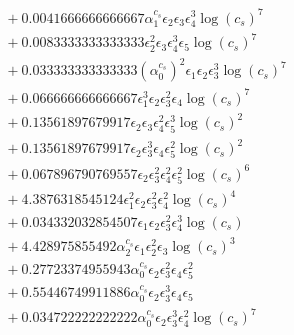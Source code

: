 \documentclass[10pt]{article}
\begin{document}
\begin{align*}
&{}  + 0.0041666666666667 \alpha_{1}^{c_s} \epsilon_{2} \epsilon_{3} \epsilon_{4}^{3} \log{\left(c_{s} \right)}^{7} \\
&{}  + 0.0083333333333333 \epsilon_{2}^{2} \epsilon_{3} \epsilon_{4}^{3} \epsilon_{5} \log{\left(c_{s} \right)}^{7} \\
&{}  + 0.033333333333333 \left(\alpha_{0}^{c_s}\right)^{2} \epsilon_{1} \epsilon_{2} \epsilon_{3}^{3} \log{\left(c_{s} \right)}^{7} \\
&{}  + 0.066666666666667 \epsilon_{1}^{3} \epsilon_{2} \epsilon_{3}^{2} \epsilon_{4} \log{\left(c_{s} \right)}^{7} \\
&{}  + 0.13561897679917 \epsilon_{2} \epsilon_{3} \epsilon_{4}^{2} \epsilon_{5}^{3} \log{\left(c_{s} \right)}^{2} \\
&{}  + 0.13561897679917 \epsilon_{2} \epsilon_{3}^{3} \epsilon_{4} \epsilon_{5}^{2} \log{\left(c_{s} \right)}^{2} \\
&{}  + 0.067896790769557 \epsilon_{2} \epsilon_{3}^{2} \epsilon_{4}^{2} \epsilon_{5}^{2} \log{\left(c_{s} \right)}^{6} \\
&{}  + 4.3876318545124 \epsilon_{1}^{2} \epsilon_{2} \epsilon_{3}^{2} \epsilon_{4}^{2} \log{\left(c_{s} \right)}^{4} \\
&{}  + 0.034332032854507 \epsilon_{1} \epsilon_{2} \epsilon_{3}^{2} \epsilon_{4}^{3} \log{\left(c_{s} \right)} \\
&{}  + 4.428975855492 \alpha_{2}^{c_s} \epsilon_{1} \epsilon_{2}^{2} \epsilon_{3} \log{\left(c_{s} \right)}^{3} \\
&{}  + 0.27723374955943 \alpha_{0}^{c_s} \epsilon_{2} \epsilon_{3}^{2} \epsilon_{4} \epsilon_{5}^{2} \\
&{}  + 0.55446749911886 \alpha_{0}^{c_s} \epsilon_{2} \epsilon_{3}^{3} \epsilon_{4} \epsilon_{5} \\
&{}  + 0.034722222222222 \alpha_{0}^{c_s} \epsilon_{2} \epsilon_{3}^{3} \epsilon_{4}^{2} \log{\left(c_{s} \right)}^{7}
\end{align*}
\end{document}
